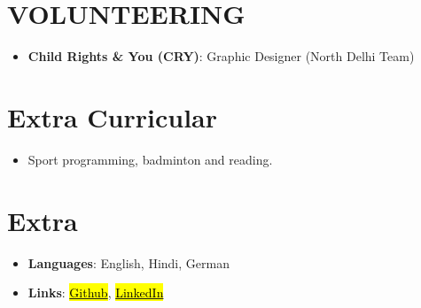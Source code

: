 \documentclass[letterpaper,10.5pt]{article}
\makeatletter
\newcommand{\resumeItem}[2]{
  \item\normalsize{
    \textbf{#1}{#2}
  }
}
\newcommand{\resumeSubheading}[4]{
  \vspace{-1pt}\item
    \begin{tabular*}{0.97\textwidth}{l@{\extracolsep{\fill}}r}
      \textbf{#1} & #2 \\
      \textit{\normalsize#3} & {\normalsize #4} \\
    \end{tabular*}\vspace{-5pt}
}
\newcommand{\resumeSubItem}[2]{\resumeItem{#1}{#2}\vspace{-4pt}}
\newcommand{\resumeSubHeadingListStart}{\begin{itemize}[leftmargin=*]}
\newcommand{\resumeSubHeadingListEnd}{\end{itemize}}
\newcommand{\resumeItemListStart}{\begin{itemize}}
\newcommand{\resumeItemListEnd}{\end{itemize}\vspace{-5pt}}
\makeatother
\begin{document}

\section{VOLUNTEERING}
  \resumeSubHeadingListStart
        \resumeSubItem{Child Rights \& You (CRY)}
        {:    Graphic Designer (North Delhi Team)}
        
    \resumeSubHeadingListEnd
    
\section{Extra Curricular}
    \resumeSubHeadingListStart
        \resumeSubItem{}
        {Sport programming, badminton and reading.}
    
    \resumeSubHeadingListEnd
    
\section{Extra}
    \resumeSubHeadingListStart
        \resumeSubItem{Languages}
        {:    English, Hindi, German}
            
        \resumeSubItem{Links}
        {:    
        \href{https://github.com/prakashdanish}{\hl{Github}},         
        \href{https://www.linkedin.com/in/danishprakash/}{\hl{LinkedIn}}}
        
    \resumeSubHeadingListEnd
    
    
\end{document}
